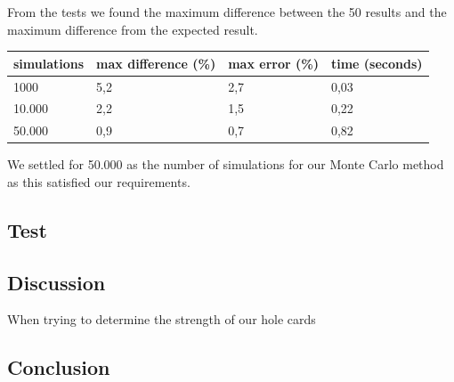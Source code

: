 From the tests we found the maximum difference between the 50 results and the maximum difference from the expected result.

\vspace{4mm}
\begin{tabular}{ | l | l | l | l | }
  \hline
  simulations & max difference (\%) & max error (\%) & time (seconds) \\
  \hline                       
  1000 & 5,2 & 2,7 & 0,03 \\
  10.000 & 2,2 & 1,5 &  0,22\\
  50.000 & 0,9 & 0,7 & 0,82\\
  \hline  
\end{tabular}
\vspace{4mm}

We settled for 50.000 as the number of simulations for our Monte Carlo method as this satisfied our requirements.

\subsection{Test}


\subsection{Discussion}
When trying to determine the strength of our hole cards

\subsection{Conclusion}